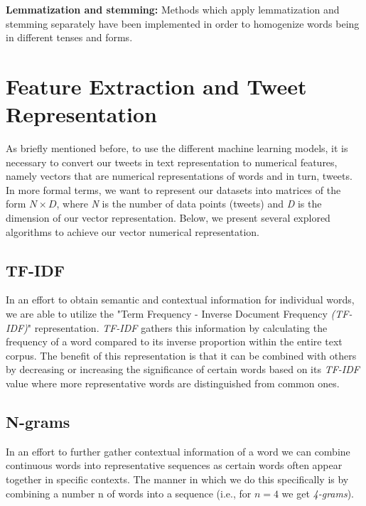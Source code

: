 \documentclass[10pt,conference]{IEEEtran}
\begin{document}
\textbf{Lemmatization and stemming:} Methods which apply lemmatization and stemming separately have been implemented in order to homogenize words being in different tenses and forms.


\section{Feature Extraction and Tweet Representation}
\label{sec:tweet-representation}

As briefly mentioned before, to use the different machine learning models, it is necessary to convert our tweets in text representation to numerical features, namely vectors that are numerical representations of words and in turn, tweets. In more formal terms, we want to represent our datasets into matrices of the form $N \times D$, where \textit{N} is the number of data points (tweets) and \textit{D} is the dimension of our vector representation. Below, we present several explored algorithms to achieve our vector numerical representation.

\subsection{TF-IDF}
In an effort to obtain semantic and contextual information for individual words, we are able to utilize the "Term Frequency - Inverse Document Frequency \textit{(TF-IDF)}" representation. \textit{TF-IDF} gathers this information by calculating the frequency of a word compared to its inverse proportion within the entire text corpus. The benefit of this representation is that it can be combined with others by decreasing or increasing the significance of certain words based on its \textit{TF-IDF} value where more representative words are distinguished from common ones.

\subsection{N-grams}
In an effort to further gather contextual information of a word we can combine continuous words into representative sequences as certain words often appear together in specific contexts. The manner in which we do this specifically is by combining a number n of words into a sequence (i.e., for $n=4$ we get \textit{4-grams}).
\end{document}
